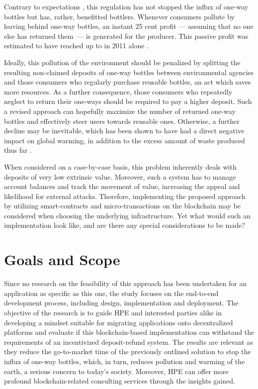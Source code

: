 Contrary to expectations  \cite[p.~10]{Hartlep2011Recycling}, this regulation has not stopped the influx of one-way bottles but has, rather, benefitted bottlers. Whenever consumers pollute by leaving behind one-way bottles, an instant 25 cent profit --- assuming that no one else has returned them~--- is generated for the producer. This passive profit was estimated to have reached up to  in 2011 alone \cite[p.~245]{PWC2011Mehrweg}. 

Ideally, this pollution of the environment should be penalized by splitting the resulting non-claimed deposits of one-way bottles between environmental agencies and those consumers who regularly purchase reusable bottles, an act which saves more resources. As a further consequence, those consumers who repeatedly neglect to return their one-ways should be required to pay a higher deposit. Such a revised approach can hopefully maximize the number of returned one-way bottles and effectively steer users towards reusable ones. Otherwise, a further decline may be inevitable, which has been shown to have had a direct negative impact on global warming, in addition to the excess amount of waste produced thus far \cite{DUHEinweg}.

When considered on a case-by-case basis, this problem inherently deals with deposits of very low extrinsic value. Moreover, such a system has to manage account balances and track the movement of value, increasing the appeal and likelihood for external attacks. Therefore, implementing the proposed approach by utilizing smart-contracts and micro-transactions on the blockchain may be considered when choosing the underlying infrastructure. Yet what would such an implementation look like, and are there any special considerations to be made? 


\section{Goals and Scope}
\label{sec:goalsScope}
Since no research on the feasibility of this approach has been undertaken for an application as specific as this one, the study focuses on the end-to-end development process, including design, implementation and deployment. The objective of the research is to guide \ac{HPE} and interested parties alike in developing a mindset suitable for migrating applications onto decentralized platforms and evaluate if this blockchain-based implementation can withstand the requirements of an incentivized deposit-refund system. The results are relevant as they reduce the go-to-market time of the previously outlined solution to stop the influx of one-way bottles, which, in turn, reduces pollution and warming of the earth, a serious concern to today's society. Moreover, \ac{HPE} can offer more profound blockchain-related consulting services through the insights gained.

